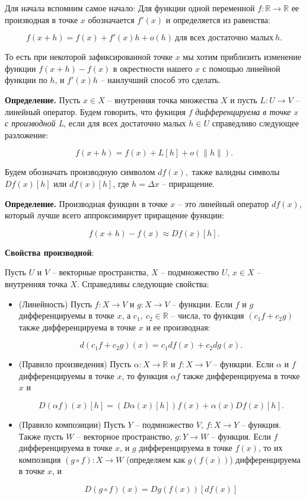 Для начала вспомним самое начало:
Для функции одной переменной $f: \mathbb{R} \to \mathbb{R}$ ее производная в точке $x$ обозначается $f'(x)$ и определяется из равенства:

$$f(x+h) = f(x) + f'(x)h + o(h)\ \text{для всех достаточно малых}\ h.$$

То есть при некоторой зафиксированной точке $x$ мы хотим приблизить изменение функции $f(x + h) - f(x)$ в окрестности нашего $x$ с помощью линейной функции по $h$, и $f'(x)h$ -- наилучший способ это сделать.
\bigskip

\textbf{Определение.} Пусть $x\in X$ -- внутренняя точка множества $X$ и пусть $L : U \to V$ -- линейный оператор. Будем говорить, что фукнция $f$ \textit{дифференцируема в точке x с производной L}, если для всех достаточно малых $h \in U$ справедливо следующее разложение:

$$f(x+h) = f(x) + L[h] + o(\|h\|).$$

Будем обозначать производную символом $df(x),$ также валидны символы $Df(x)[h]$ или $df(x)[h]$, где $h = \Delta x$ -- приращение.
\bigskip

\textbf{Определение.} Производная функции в точке $x$ --  это линейный оператор $df(x)$, который лучше всего аппроксимирует приращение функции:

$$f(x+h) - f(x) \approx Df(x)[h].$$

\textbf{Свойства производной}:

Пусть $U$ и $V$ -- векторные пространства, $X$ -- подмножество $U$, $x\in X$ -- внутренняя точка $X$. Справедливы следующие свойства:

\begin{itemize}
    \item (Линейность) Пусть $f : X \to V$ и $g : X \to V$ -- функции. Если $f$ и $g$ дифференцируемы в точке $x$, а $c_1,\ c_2\in\mathbb{R}$ -- числа, то функция $(c_1f + c_2g)$ также дифференцируема в точке $x$ и ее производная:

    $$d(c_1f + c_2g)(x) = c_1df(x) + c_2dg(x).$$

    \item (Правило произведения) Пусть $\alpha: X \to \mathbb{R}$ и $f : X \to V$ -- функции. Если $\alpha$ и $f$ дифференцируемы в точке $x$, то функция $\alpha f$ также дифференцируема в точке $x$ и

    $$D(\alpha f)(x)[h] = (D \alpha(x)[h])f(x) + \alpha(x)Df(x)[h].$$


    \item (Правило композиции) Пусть $Y$ -- подмножество $V$, $f : X \to Y$ -- функция. Также пусть $W$ -- векторное пространство, $g : Y \to W$ -- функция. Если $f$ дифференцируема в точке $x$, и $g$ дифференцируема в точке $f(x)$, то их композиция $(g \circ f) : X \to W$ (определяем как $g(f(x))$) дифференцируема в точке $x$, и

    $$D(g \circ f)(x) = Dg(f(x))[df(x)] $$
\end{itemize}
\bigskip

